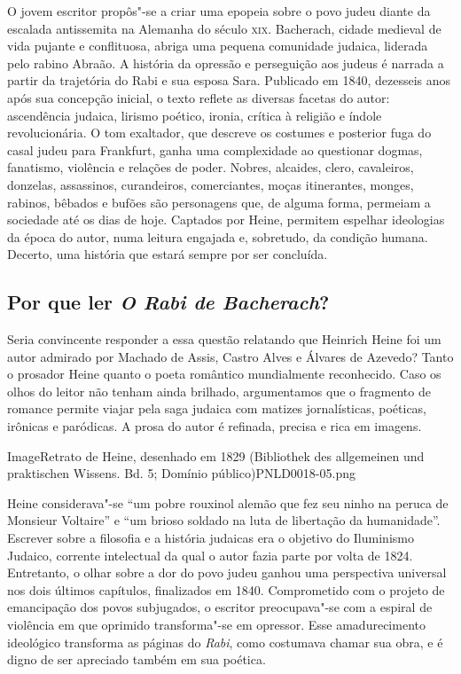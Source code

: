 \documentclass[12pt]{extarticle}
\begin{document}
O jovem escritor propôs"-se a criar uma epopeia sobre o
povo judeu diante da escalada antissemita na Alemanha do século \textsc{xix}.
Bacherach, cidade medieval de vida pujante e conflituosa, abriga uma
pequena comunidade judaica, liderada pelo rabino Abraão. A história da
opressão e perseguição aos judeus é narrada a partir da trajetória do
Rabi e sua esposa Sara. Publicado em 1840, dezesseis anos após sua
concepção inicial, o texto reflete as diversas facetas do autor:
ascendência judaica, lirismo poético, ironia, crítica à religião e
índole revolucionária. O tom exaltador, que descreve os costumes e
posterior fuga do casal judeu para Frankfurt, ganha uma complexidade ao
questionar dogmas, fanatismo, violência e relações de poder.
Nobres, alcaides, clero, cavaleiros, donzelas, assassinos, curandeiros,
comerciantes, moças itinerantes, monges, rabinos, bêbados e bufões são
personagens que, de alguma forma, permeiam a sociedade até os dias de
hoje. Captados por Heine, permitem espelhar ideologias da época do
autor, numa leitura engajada e, sobretudo, da condição humana. Decerto,
uma história que estará sempre por ser concluída.

\subsection{Por que ler \textit{O Rabi de Bacherach}?}

Seria convincente responder a essa questão relatando que Heinrich Heine
foi um autor admirado por Machado de Assis, Castro Alves e Álvares de
Azevedo? Tanto o prosador Heine quanto o poeta romântico mundialmente
reconhecido. Caso os olhos do leitor não tenham ainda brilhado,
argumentamos que o fragmento de romance permite viajar pela saga judaica
com matizes jornalísticas, poéticas, irônicas e paródicas. A prosa do
autor é refinada, precisa e rica em imagens.


Image{Retrato de Heine, desenhado em 1829 (Bibliothek des allgemeinen und praktischen Wissens. Bd. 5; Domínio público)}{PNLD0018-05.png}


Heine considerava"-se ``um pobre rouxinol alemão que fez seu ninho na
peruca de Monsieur Voltaire'' e ``um brioso soldado na luta de
libertação da humanidade''. Escrever sobre a filosofia e a história
judaicas era o objetivo do Iluminismo Judaico, corrente intelectual da
qual o autor fazia parte por volta de 1824. Entretanto, o olhar sobre a
dor do povo judeu ganhou uma perspectiva universal nos dois últimos
capítulos, finalizados em 1840. Comprometido com o projeto de
emancipação dos povos subjugados, o escritor preocupava"-se com a espiral
de violência em que oprimido transforma"-se em opressor. Esse
amadurecimento ideológico transforma as páginas do \emph{Rabi}, como costumava
chamar sua obra, e é digno de ser apreciado também em sua poética.
\end{document}
